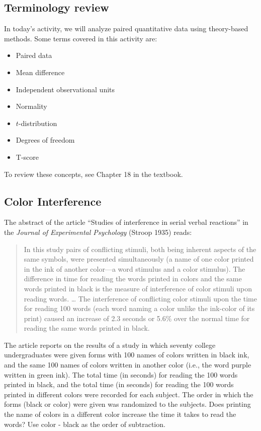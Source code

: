 \documentclass[
]{report}
\begin{document}
\hypertarget{terminology-review-2}{%
\subsection{Terminology review}\label{terminology-review-2}}

In today's activity, we will analyze paired quantitative data using theory-based methods. Some terms covered in this activity are:

\begin{itemize}
\item
  Paired data
\item
  Mean difference
\item
  Independent observational units
\item
  Normality
\item
  \(t\)-distribution
\item
  Degrees of freedom
\item
  T-score
\end{itemize}

To review these concepts, see Chapter 18 in the textbook.

\hypertarget{color-interference}{%
\subsection{Color Interference}\label{color-interference}}

The abstract of the article ``Studies of interference in serial verbal reactions'' in the \emph{Journal of Experimental Psychology} (Stroop 1935) reads:

\begin{quote}
In this study pairs of conflicting stimuli, both being inherent aspects of the same symbols, were presented simultaneously (a name of one color printed in the ink of another color---a word stimulus and a color stimulus).
The difference in time for reading the words printed in colors and the same words printed in black is the measure of interference of color stimuli upon reading words. \ldots{}
The interference of conflicting color stimuli upon the time for reading 100 words (each word naming a color unlike the ink-color of its print) caused an increase of 2.3 seconds or 5.6\% over the normal time for reading the same words printed in black.
\end{quote}

The article reports on the results of a study in which seventy college undergraduates were given forms with 100 names of colors written in black ink, and the same 100 names of colors written in another color (i.e., the word purple written in green ink). The total time (in seconds) for reading the 100 words printed in black, and the total time (in seconds) for reading the 100 words printed in different colors were recorded for each subject. The order in which the forms (black or color) were given was randomized to the subjects. Does printing the name of colors in a different color increase the time it takes to read the words? Use color - black as the order of subtraction.
\end{document}
